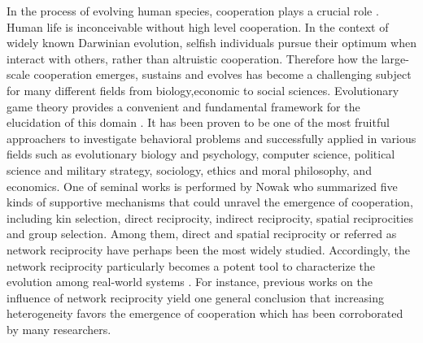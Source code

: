 \documentclass[preprint,12pt,3p]{elsarticle}
\begin{document}
In the process of evolving human species, cooperation plays a
crucial role \cite{hammerstein2003genetic,hofbauer1998evolutionary}.
Human life is inconceivable without high level cooperation.
In the context of widely known Darwinian evolution, selfish individuals pursue
their optimum when interact with others, rather than altruistic cooperation.
Therefore how the large-scale cooperation emerges, sustains and evolves has become a
challenging subject for many different fields from biology,economic to social sciences.
    Evolutionary game theory\cite{smith1982evolution,nowakevolutionary} provides a convenient
and fundamental framework for the elucidation of this domain
\cite{Trivers-18254,RapoportChammah-18253,FundenbergMaskin-18255,KendallYao-18256}.
It has been proven to be one of the most fruitful approachers to investigate behavioral problems and successfully applied in various fields such as evolutionary biology and psychology,
computer science, political science and military strategy, sociology,
ethics and moral philosophy, and economics\cite{NowakSigmund-18283,PoncelaGómez-Gardeñes-18278,Tanimoto-18277,
ImhofFudenberg-18279,SantosPacheco-18280,Gracia-LázaroCuesta-18281,AntonioniTomassini-18282,
TanimotoBrede-18276}.
    One of seminal works is performed by Nowak \cite{Nowak-18317}who summarized five kinds of supportive mechanisms
that could unravel the emergence of cooperation, including kin selection, direct reciprocity,
indirect reciprocity, spatial reciprocities and group selection.
Among them, direct and spatial reciprocity or referred as network reciprocity have perhaps been the
most widely studied.
Accordingly, the network reciprocity particularly  becomes a potent tool to characterize the evolution
among real-world systems \cite{boccaletti2006complex}.
For instance, previous works on the influence of network reciprocity yield one general conclusion that increasing heterogeneity favors the emergence of cooperation which has been corroborated
by many researchers\cite{SantosPacheco-18280,NishiShirado-18210,HuangZheng-18221}.
\end{document}
